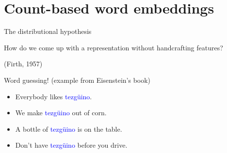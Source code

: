 \documentclass[usenames,dvipsnames,notes,11pt,aspectratio=169]{beamer}
\begin{document}
\section{Count-based word embeddings}

\begin{frame}
    {The distributional hypothesis}
    
    How do we come up with a representation without handcrafting features?
    \medskip\pause 

     (Firth, 1957)
    \pause

    Word guessing! (example from Eisenstein's book)\\
    \begin{itemize}[<+->]
        \item[] Everybody likes \textcolor{blue}{tezg\"uino}.
        \item[] We make \textcolor{blue}{tezg\"uino} out of corn.
        \item[] A bottle of \textcolor{blue}{tezg\"uino} is on the table.
        \item[] Don't have \textcolor{blue}{tezg\"uino} before you drive.
    \end{itemize}

\end{frame}
\end{document}
